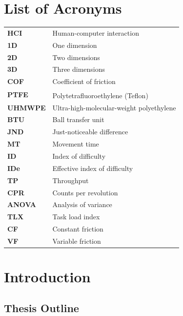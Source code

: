 \documentclass [12pt,letterpaper]{report}
\begin{document}
\chapter*{List of Acronyms}
\begin{table}[!h]
  	\begin{tabular}{p{} p{}}
		\textbf{HCI}  &  Human-computer interaction\\
		\textbf{1D}  &  One dimension\\
		\textbf{2D}  &  Two dimensions\\
    	\textbf{3D}  &  Three dimensions\\
		\textbf{COF}  &  Coefficient of friction\\
		\textbf{PTFE}  &  Polytetrafluoroethylene (Teflon\textsuperscript{\textregistered})\\
		\textbf{UHMWPE}  &  Ultra-high-molecular-weight polyethylene\\
		\textbf{BTU}  &  Ball transfer unit\\
		\textbf{JND}  &  Just-noticeable difference\\
		\textbf{MT}  &  Movement time\\		
		\textbf{ID}  &  Index of difficulty\\
		\textbf{IDe}  &  Effective index of difficulty\\
		\textbf{TP}  &  Throughput\\
		\textbf{CPR} &  Counts per revolution\\
    	\textbf{ANOVA} &  Analysis of variance\\
		\textbf{TLX} &  Task load index\\    	
    	\textbf{CF} &  Constant friction\\
    	\textbf{VF} &  Variable friction\\
    	
  	\end{tabular}
\end{table}

\cleardoublepage
{}




\chapter{Introduction}
\label{intro}

\section{Thesis Outline}
\end{document}
